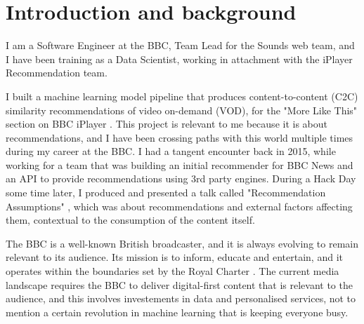 
\section{Introduction and background}

I am a Software Engineer at the BBC, Team Lead for the Sounds web team, and I have been training as a Data Scientist,
working in attachment with the iPlayer Recommendation team.

I built a machine learning model pipeline that produces content-to-content (C2C) similarity recommendations
of video on-demand (VOD), for the "More Like This" section on BBC iPlayer \cite{MoreLikeBluey}.
This project is relevant to me because it is about recommendations, and I have been crossing paths with this world
multiple times during my career at the BBC.
I had a tangent encounter back in 2015, while working for a team that was building
an initial recommender for BBC News and an API to provide recommendations using 3rd party engines.
During a Hack Day some time later, I produced and presented a talk called
"Recommendation Assumptions" \cite{RecsAssumptions}, which was about recommendations and external factors affecting
them, contextual to the consumption of the content itself.

The BBC is a well-known British broadcaster, and it is always evolving to remain relevant to its audience. Its mission
is to inform, educate and entertain, and it operates within the boundaries set by the Royal Charter \cite{RoyalCharterBBC}.
The current media landscape requires the BBC to deliver digital-first content that is relevant to the audience,
and this involves investements in data and personalised services, not to mention a certain revolution in machine learning
that is keeping everyone busy.
